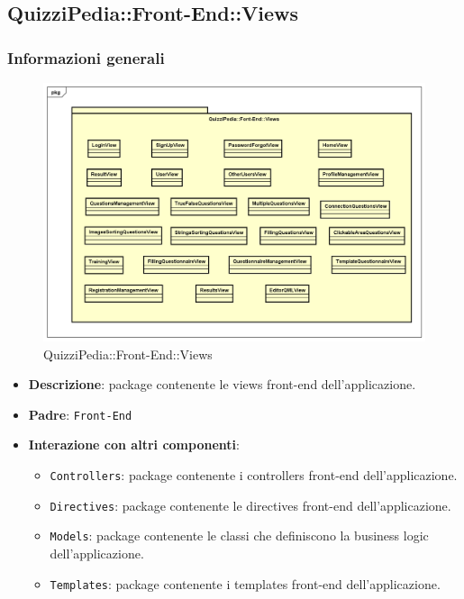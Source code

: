 \newpage

\subsection{QuizziPedia::Front-End::Views}
\subsubsection{Informazioni generali}
\label{QuizziPedia::Front-End}
\begin{figure}
	\centering
	\includegraphics[scale=0.45]{UML/Package/QuizziPedia_Front-End_View.png}
	\caption{QuizziPedia::Front-End::Views}
\end{figure}
\begin{itemize}
	\item \textbf{Descrizione}: package contenente le views front-end dell'applicazione.
	\item \textbf{Padre}: \texttt{Front-End}
	\item \textbf{Interazione con altri componenti}:
	\begin{itemize}
		\item \texttt{Controllers}: package contenente i controllers front-end dell'applicazione.
		\item \texttt{Directives}: package contenente le directives front-end dell'applicazione.
		\item \texttt{Models}: package contenente le classi che definiscono la business logic dell'applicazione.
		\item \texttt{Templates}: package contenente i templates front-end dell'applicazione.
	\end{itemize}
\end{itemize}
